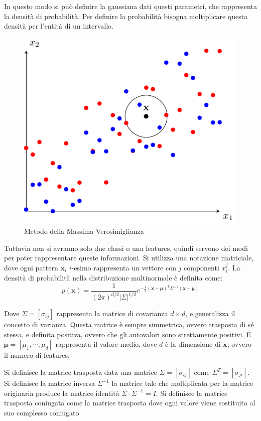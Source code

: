 \documentclass{article}
\numberwithin{equation}{subsection}
\newcommand{\vect}[1]{\boldsymbol{\mathbf{#1}}}
\begin{document}
In questo modo si può definire la gaussiana dati questi parametri, che rappresenta la densità di probabilità. Per definire la probabilità bisogna moltiplicare questa densità per l'entità di un intervallo. 

\begin{figure}[H]%
    \centering%
    \includegraphics[scale=0.8]{massima_verosimiglianza.pdf}%
    \caption{Metodo della Massima Verosimiglianza}%
\end{figure}

Tuttavia non si avranno solo due classi o una features, quindi servono dei modi per poter rappresentare queste informazioni. Si utilizza una notazione matriciale, dove ogni pattern $\vect{x}_i$ $i$-esimo rappresenta un vettore con $j$ componenti $x_i^j$. La densità di probabilità nella distribuzione multinormale è definita come:
\begin{equation}
    p(\vect{x})=\displaystyle\frac{1}{(2\pi)^{d/2}{|\Sigma|}^{1/2}}e^{-\frac{1}{2}(\vect{x}-\vect{\mu})^T\Sigma^{-1}(\vect{x}-\vect{\mu})}
\end{equation}

Dove $\Sigma=[\sigma_{ij}]$ rappresenta la matrice di covarianza $d\times d$, e generalizza il concetto di varianza. Questa matrice è sempre simmetrica, ovvero trasposta di sé stessa, e definita positiva, ovvero che gli autovalori sono strettamente positivi. E $\vect{\mu}=[\mu_1,\cdots,\mu_d]$ rappresenta il valore medio, dove $d$ è la dimensione di $\vect{x}$, ovvero il numero di features. 

Si definisce la matrice trasposta data una matrice $\Sigma=[\sigma_{ij}]$ come $\Sigma^T=[\sigma_{ji}]$. Si definisce la matrice inversa $\Sigma^{-1}$ la matrice tale che moltiplicata per la matrice originaria produce la matrice identità $\Sigma\cdot\Sigma^{-1}=I$. Si definisce la matrice trasposta coniugata come la matrice trasposta dove ogni valore viene sostituito al suo complesso coniugato. 
\end{document}
